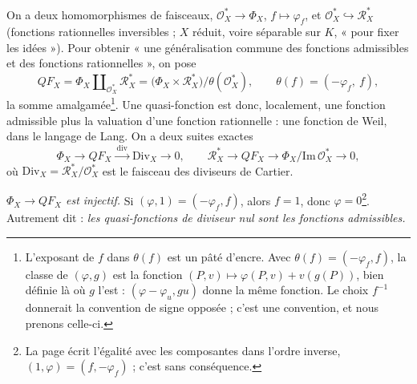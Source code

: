 \documentclass[11pt,a4paper]{article}
\begin{document}
On a deux homomorphismes de faisceaux, $\mathcal{O}_X^* \to \Phi_X$,
$f \mapsto \varphi_f$, et $\mathcal{O}_X^* \hookrightarrow \mathcal{R}^*_X$
(fonctions rationnelles inversibles ; $X$ réduit, voire séparable sur $K$,
« pour fixer les idées »). Pour obtenir « une généralisation commune des
fonctions admissibles et des fonctions rationnelles », on pose
\[
  QF_X = \Phi_X \amalg_{\mathcal{O}_X^*} \mathcal{R}^*_X
  = \bigl(\Phi_X \times \mathcal{R}^*_X\bigr)/\theta(\mathcal{O}_X^*),
  \qquad \theta(f) = (-\varphi_f,\ f),
\]
la somme amalgamée\footnote{L'exposant de $f$ dans $\theta(f)$ est un pâté
d'encre. Avec $\theta(f) = (-\varphi_f, f)$, la classe de $(\varphi, g)$ est
la fonction $(P, v) \mapsto \varphi(P, v) + v(g(P))$, bien définie là où $g$
l'est : $(\varphi - \varphi_u, gu)$ donne la même fonction. Le choix
$f^{-1}$ donnerait la convention de signe opposée ; c'est une convention,
et nous prenons celle-ci.}. Une quasi-fonction est donc, localement, une
fonction admissible plus la valuation d'une fonction rationnelle : une
fonction de Weil, dans le langage de Lang. On a deux suites exactes
\[
  \Phi_X \longrightarrow QF_X \xrightarrow{\ \mathrm{div}\ }
  \mathrm{Div}_X \longrightarrow 0, \qquad
  \mathcal{R}^*_X \longrightarrow QF_X \longrightarrow
  \Phi_X/\mathrm{Im}\,\mathcal{O}_X^* \longrightarrow 0,
\]
où $\mathrm{Div}_X = \mathcal{R}^*_X/\mathcal{O}_X^*$ est le faisceau des
diviseurs de Cartier.

\emph{$\Phi_X \to QF_X$ est injectif.} Si $(\varphi, 1) = (-\varphi_f, f)$,
alors $f = 1$, donc $\varphi = 0$\footnote{La page écrit l'égalité avec les
composantes dans l'ordre inverse, $(1, \varphi) = (f, -\varphi_f)$ ; c'est
sans conséquence.}. Autrement dit : \emph{les quasi-fonctions de diviseur
nul sont les fonctions admissibles.}
\end{document}
